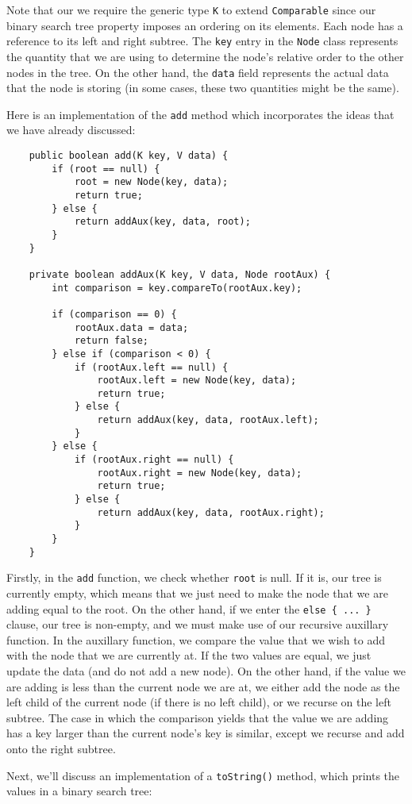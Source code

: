 Note that our we require the generic type \verb!K! to extend \verb!Comparable! since our binary search tree property imposes an ordering on its elements. Each node has a reference to its left and right subtree. The \verb!key! entry in the \verb!Node! class represents the quantity that we are using to determine the node's relative order to the other nodes in the tree. On the other hand, the \verb!data! field represents the actual data that the node is storing (in some cases, these two quantities might be the same). 

Here is an implementation of the \verb!add! method which incorporates the ideas that we have already discussed:

\begin{lstlisting}
	public boolean add(K key, V data) {
		if (root == null) {
			root = new Node(key, data);
			return true;
		} else {
			return addAux(key, data, root);
		}
	}

	private boolean addAux(K key, V data, Node rootAux) {
		int comparison = key.compareTo(rootAux.key);

		if (comparison == 0) {
			rootAux.data = data;
			return false;
		} else if (comparison < 0) {
			if (rootAux.left == null) {
				rootAux.left = new Node(key, data);
				return true;
			} else {
				return addAux(key, data, rootAux.left);
			}
		} else {
			if (rootAux.right == null) {
				rootAux.right = new Node(key, data);
				return true;
			} else {
				return addAux(key, data, rootAux.right);
			}
		}
	}
\end{lstlisting}

Firstly, in the \verb!add! function, we check whether \verb!root! is null. If it is, our tree is currently empty, which means that we just need to make the node that we are adding equal to the root. On the other hand, if we enter the \verb!else { ... }! clause, our tree is non-empty, and we must make use of our recursive auxillary function. In the auxillary function, we compare the value that we wish to add with the node that we are currently at. If the two values are equal, we just update the data (and do not add a new node). On the other hand, if the value we are adding is less than the current node we are at, we either add the node as the left child of the current node (if there is no left child), or we recurse on the left subtree. The case in which the comparison yields that the value we are adding has a key larger than the current node's key is similar, except we recurse and add onto the right subtree. 


Next, we'll discuss an implementation of a \verb!toString()! method, which prints the values in a binary search tree:

